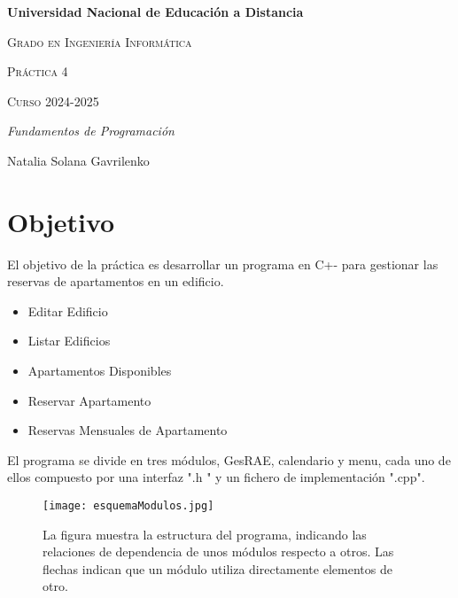 \documentclass[12pt]{article}
\begin{document}
	\begin{titlepage}
		\centering
		{\bfseries\LARGE Universidad Nacional de Educación a Distancia  \par}
		\vspace{1cm}
		{\scshape\Large Grado en Ingeniería Informática \par}
		\vspace{1cm}
		{\scshape\LARGE Práctica 4 \par}
		\vspace{0.2cm}
		{\scshape\Large Curso 2024-2025 \par}
		\vspace{1.5cm}
		{\itshape\LARGE Fundamentos de Programación\par}
		\vspace{2 cm}
		{\Large Natalia Solana Gavrilenko \par}
	
	\end{titlepage}
	
	\tableofcontents
	\newpage
	
	\section{\textbf{Objetivo}}
	El objetivo de la práctica es desarrollar un programa en C+- para gestionar las reservas de apartamentos en un edificio.
	
	\begin{itemize}
		\item Editar Edificio
		\item Listar Edificios
		\item Apartamentos Disponibles
		\item Reservar Apartamento
		\item Reservas Mensuales de Apartamento
	\end{itemize}
	
	El programa se divide en tres módulos, GesRAE, calendario y menu, cada uno de ellos compuesto por una interfaz ".h " y un fichero de implementación ".cpp".
	
	\begin{figure}[h]
		\centering
		\texttt{[image: esquemaModulos.jpg]}
		\caption{La figura muestra la estructura del programa, indicando las relaciones de dependencia de unos módulos respecto a otros. Las flechas indican que un módulo utiliza directamente elementos de otro.}
		\label{fig:png}
	\end{figure}
	
\end{document}
